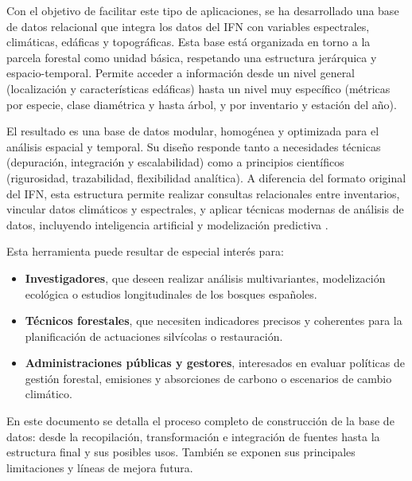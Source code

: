 \medskip

Con el objetivo de facilitar este tipo de aplicaciones, se ha desarrollado una base de datos relacional que integra los datos del IFN con variables espectrales, climáticas, edáficas y topográficas. Esta base está organizada en torno a la parcela forestal como unidad básica, respetando una estructura jerárquica y espacio-temporal. Permite acceder a información desde un nivel general (localización y características edáficas) hasta un nivel muy específico (métricas por especie, clase diamétrica y hasta árbol, y por inventario y estación del año).

\medskip

El resultado es una base de datos modular, homogénea y optimizada para el análisis espacial y temporal. Su diseño responde tanto a necesidades técnicas (depuración, integración y escalabilidad) como a principios científicos (rigurosidad, trazabilidad, flexibilidad analítica). A diferencia del formato original del IFN, esta estructura permite realizar consultas relacionales entre inventarios, vincular datos climáticos y espectrales, y aplicar técnicas modernas de análisis de datos, incluyendo inteligencia artificial y modelización predictiva \cite{copernicus_api, miteco_abexante_2025}.


Esta herramienta puede resultar de especial interés para:
\begin{itemize}
    \item \textbf{Investigadores}, que deseen realizar análisis multivariantes, modelización ecológica o estudios longitudinales de los bosques españoles.
    \item \textbf{Técnicos forestales}, que necesiten indicadores precisos y coherentes para la planificación de actuaciones silvícolas o restauración.
    \item \textbf{Administraciones públicas y gestores}, interesados en evaluar políticas de gestión forestal, emisiones y absorciones de carbono o escenarios de cambio climático.
\end{itemize}

En este documento se detalla el proceso completo de construcción de la base de datos: desde la recopilación, transformación e integración de fuentes hasta la estructura final y sus posibles usos. También se exponen sus principales limitaciones y líneas de mejora futura.